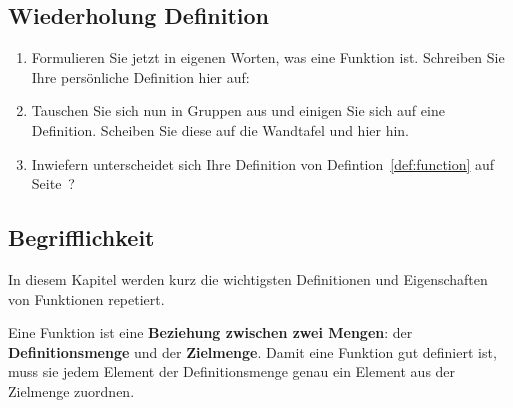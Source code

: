 \documentclass[12pt]{article}
\begin{document}
\subsection{Wiederholung Definition}
\begin{exercise}
\begin{enumerate}[label=\alph*)]
\item Formulieren Sie jetzt in eigenen Worten, was eine Funktion ist. Schreiben Sie Ihre persönliche Definition hier auf:
\vspace*{3.5cm}

\item Tauschen Sie sich nun in Gruppen aus und einigen Sie sich auf eine Definition. Scheiben Sie diese auf die Wandtafel und hier hin.\vspace*{3.5cm}
\item Inwiefern unterscheidet sich Ihre Definition von Defintion~\ref{def:function} auf Seite~\pageref{def:function}?
\vspace*{3.5cm}
\end{enumerate}
\end{exercise}
\newpage
\subsection{Begrifflichkeit}

In diesem Kapitel werden kurz die wichtigsten Definitionen und Eigenschaften von Funktionen repetiert.

\begin{whitebox}
\begin{definition}\label{def:function}
Eine Funktion ist eine \textbf{Beziehung zwischen zwei Mengen}: der \textbf{Definitionsmenge} und der \textbf{Zielmenge}. Damit eine Funktion gut definiert ist, muss sie jedem Element der Definitionsmenge genau ein Element aus der Zielmenge zuordnen.
\end{definition}
\end{whitebox}
\end{document}
